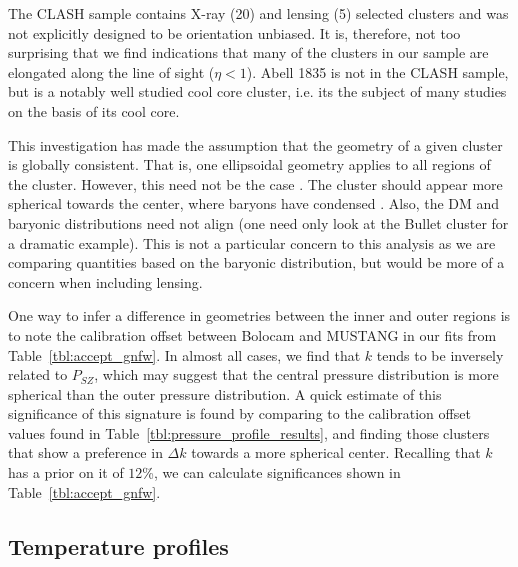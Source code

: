 \documentclass[iop,numberedappendix,apj]{emulateapj}
\begin{document}
The CLASH sample contains X-ray (20) and lensing (5) selected clusters and was not explicitly designed to
be orientation unbiased. It is, therefore, not too surprising that we find indications that many of the clusters 
in our sample are elongated along the line of sight ($\eta < 1$).
Abell 1835 is not in the CLASH sample, but is a notably well studied cool core cluster, i.e. its the subject 
of many studies on the basis of its cool core.

This investigation has made the assumption that the geometry of a given cluster is globally consistent.
That is, one ellipsoidal geometry applies to all regions of the cluster. However, this need not be the
case \citep{kravtsov2012}. The cluster should appear more spherical towards the center, where baryons have
condensed \citep[e.g.][and references therein]{kravtsov2012}. Also, the DM and baryonic distributions
need not align (one need only look at the Bullet cluster \citep{Markevitch2004} for a dramatic example).
This is not a particular concern to this analysis as we are comparing quantities based on the baryonic
distribution, but would be more of a concern when including lensing. 

One way to infer a difference in geometries between the inner and outer regions is to note the calibration
offset between Bolocam and MUSTANG in our fits from Table~\ref{tbl:accept_gnfw}. In almost all cases, we
find that $k$ tends to be inversely related to $P_{SZ}$, which may suggest that the central pressure distribution
is more spherical than the outer pressure distribution. A quick estimate of this significance of this signature
is found by comparing to the calibration offset values found in Table~\ref{tbl:pressure_profile_results}, and
finding those clusters that show a preference in $\Delta k$ towards a more spherical center. Recalling that $k$ 
has a prior on it of $12$\%, we can calculate significances shown in Table~\ref{tbl:accept_gnfw}.


\subsection{Temperature profiles}
\label{sec:temp_profiles}

\end{document}
